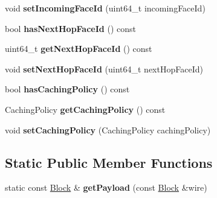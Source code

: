\begin{DoxyCompactItemize}
\item 
void {\bfseries set\+Incoming\+Face\+Id} (uint64\+\_\+t incoming\+Face\+Id)\hypertarget{classndn_1_1nfd_1_1LocalControlHeader_a49c65a792ef88761fc22cf3af1306db4}{}\label{classndn_1_1nfd_1_1LocalControlHeader_a49c65a792ef88761fc22cf3af1306db4}

\item 
bool {\bfseries has\+Next\+Hop\+Face\+Id} () const\hypertarget{classndn_1_1nfd_1_1LocalControlHeader_a242172355286a10aae5691a086587dcc}{}\label{classndn_1_1nfd_1_1LocalControlHeader_a242172355286a10aae5691a086587dcc}

\item 
uint64\+\_\+t {\bfseries get\+Next\+Hop\+Face\+Id} () const\hypertarget{classndn_1_1nfd_1_1LocalControlHeader_aed7378aedee7ff96b51ac878d7dc6dbd}{}\label{classndn_1_1nfd_1_1LocalControlHeader_aed7378aedee7ff96b51ac878d7dc6dbd}

\item 
void {\bfseries set\+Next\+Hop\+Face\+Id} (uint64\+\_\+t next\+Hop\+Face\+Id)\hypertarget{classndn_1_1nfd_1_1LocalControlHeader_a9b7afdf41ab796a4463ed1fef6244113}{}\label{classndn_1_1nfd_1_1LocalControlHeader_a9b7afdf41ab796a4463ed1fef6244113}

\item 
bool {\bfseries has\+Caching\+Policy} () const\hypertarget{classndn_1_1nfd_1_1LocalControlHeader_aed0f60af0a8930a0f3ee4cb7bfbf9a0b}{}\label{classndn_1_1nfd_1_1LocalControlHeader_aed0f60af0a8930a0f3ee4cb7bfbf9a0b}

\item 
Caching\+Policy {\bfseries get\+Caching\+Policy} () const\hypertarget{classndn_1_1nfd_1_1LocalControlHeader_af8383734ad7e12cc2af8b4fb5d08233f}{}\label{classndn_1_1nfd_1_1LocalControlHeader_af8383734ad7e12cc2af8b4fb5d08233f}

\item 
void {\bfseries set\+Caching\+Policy} (Caching\+Policy caching\+Policy)\hypertarget{classndn_1_1nfd_1_1LocalControlHeader_aff1ebe3dd3b528f246179c256424721d}{}\label{classndn_1_1nfd_1_1LocalControlHeader_aff1ebe3dd3b528f246179c256424721d}

\end{DoxyCompactItemize}
\subsection*{Static Public Member Functions}
\begin{DoxyCompactItemize}
\item 
static const \hyperlink{classndn_1_1Block}{Block} \& {\bfseries get\+Payload} (const \hyperlink{classndn_1_1Block}{Block} \&wire)\hypertarget{classndn_1_1nfd_1_1LocalControlHeader_ad7a0287c5d106894c42cdbe508bebec1}{}\label{classndn_1_1nfd_1_1LocalControlHeader_ad7a0287c5d106894c42cdbe508bebec1}

\end{DoxyCompactItemize}


